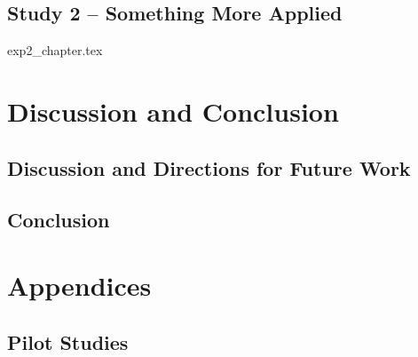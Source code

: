 \documentclass[11pt, oneside, a4paper]{book}
\begin{document}
\chapter{Study 2 -- Something More Applied} \label{ch:Exp2}
\graphicspath{{../exp2_latex/exp2/}}
{exp2_chapter.tex}


\part{Discussion and Conclusion} %
\label{Part3:Discussion}

\chapter{Discussion and Directions for Future Work} \label{ch:ThesisDiscussion}


\chapter{Conclusion} \label{ch:ThesisConclusions}




\newpage






\appendix %

\cleardoublepage{}  %

\part*{Appendices}


\chapter{Pilot Studies} \label{apx:PilotStudies}
\graphicspath{{../pilot_studies/}}

\end{document}
